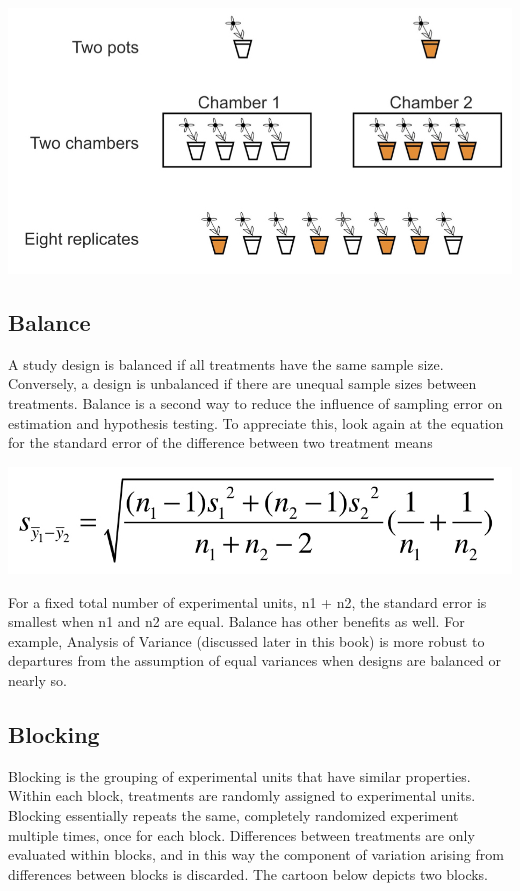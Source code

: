 \documentclass[]{book}
\begin{document}
\includegraphics[width=13.03in]{images/images_6a.006}

\hypertarget{balance}{%
\subsection{Balance}\label{balance}}

A study design is balanced if all treatments have the same sample size. Conversely, a design is unbalanced if there are unequal sample sizes between treatments. Balance is a second way to reduce the influence of sampling error on estimation and hypothesis testing. To appreciate this, look again at the equation for the standard error of the difference between two treatment means

\includegraphics[width=11.75in]{images/images_6a.007}

For a fixed total number of experimental units, n1 + n2, the standard error is smallest when n1 and n2 are equal. Balance has other benefits as well. For example, Analysis of Variance (discussed later in this book) is more robust to departures from the assumption of equal variances when designs are balanced or nearly so.

\hypertarget{blocking}{%
\subsection{Blocking}\label{blocking}}

Blocking is the grouping of experimental units that have similar properties. Within each block, treatments are randomly assigned to experimental units. Blocking essentially repeats the same, completely randomized experiment multiple times, once for each block. Differences between treatments are only evaluated within blocks, and in this way the component of variation arising from differences between blocks is discarded. The cartoon below depicts two blocks.
\end{document}
